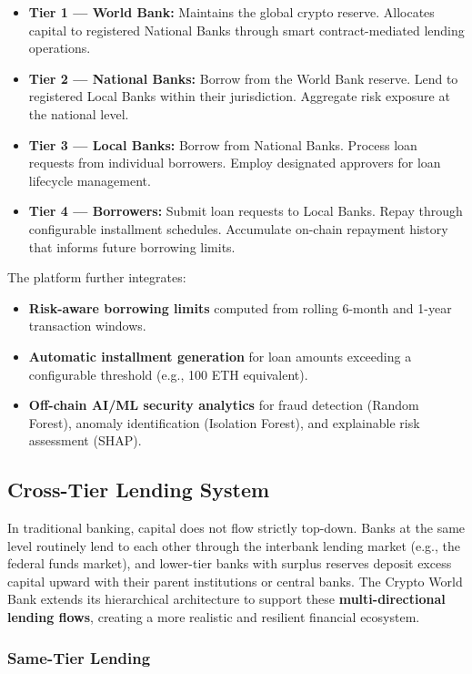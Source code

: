 \documentclass[12pt,a4paper]{report}
\begin{document}
\begin{itemize}[noitemsep]
\item \textbf{Tier 1 --- World Bank:} Maintains the global crypto reserve. Allocates capital to registered National Banks through smart contract-mediated lending operations.
\item \textbf{Tier 2 --- National Banks:} Borrow from the World Bank reserve. Lend to registered Local Banks within their jurisdiction. Aggregate risk exposure at the national level.
\item \textbf{Tier 3 --- Local Banks:} Borrow from National Banks. Process loan requests from individual borrowers. Employ designated approvers for loan lifecycle management.
\item \textbf{Tier 4 --- Borrowers:} Submit loan requests to Local Banks. Repay through configurable installment schedules. Accumulate on-chain repayment history that informs future borrowing limits.
\end{itemize}

The platform further integrates:

\begin{itemize}[noitemsep]
\item \textbf{Risk-aware borrowing limits} computed from rolling 6-month and 1-year transaction windows.
\item \textbf{Automatic installment generation} for loan amounts exceeding a configurable threshold (e.g., 100 ETH equivalent).
\item \textbf{Off-chain AI/ML security analytics} for fraud detection (Random Forest), anomaly identification (Isolation Forest), and explainable risk assessment (SHAP).
\end{itemize}

\subsection{Cross-Tier Lending System}

In traditional banking, capital does not flow strictly top-down. Banks at the same level routinely lend to each other through the interbank lending market (e.g., the federal funds market), and lower-tier banks with surplus reserves deposit excess capital upward with their parent institutions or central banks. The Crypto World Bank extends its hierarchical architecture to support these \textbf{multi-directional lending flows}, creating a more realistic and resilient financial ecosystem.

\subsubsection{Same-Tier Lending}
\end{document}
